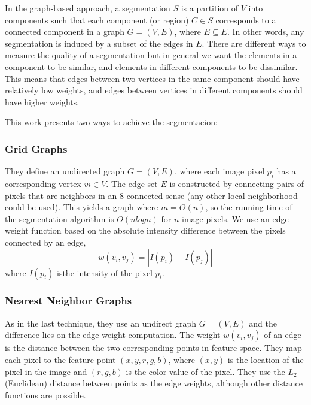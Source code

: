 In the graph-based approach, a segmentation $S$ is a partition of $V$ into components such that each component (or region) $C \in S$ corresponds to a connected component in a graph $G = (V, E)$, where $E \subseteq E$. In other words, any segmentation is induced by a subset of the edges in $E$. There are different ways to measure the quality of a segmentation but in general we want the elements in a component to be similar, and elements in different components to be dissimilar. This means that edges between two vertices in the same component should have relatively low weights, and edges between vertices in different components should have higher weights.

This work presents two ways to achieve the segmentacion:

\subsubsection{Grid Graphs}
They define an undirected graph $G = (V, E)$, where each image pixel $p_i$ has a corresponding vertex $vi \in V$. The edge set $E$ is constructed by connecting pairs of pixels that are neighbors in an 8-connected sense (any other local neighborhood could be used). This yields a graph where $m = O(n)$, so the running time of the segmentation algorithm is $O(n log n)$ for $n$ image pixels. We use an edge weight function based on the absolute intensity difference between the pixels connected by an edge, $$w(v_i, v_j) = |I(p_i) - I(p_j)|$$ where $I(p_i)$ isthe intensity of the pixel $p_i$.


\subsubsection{Nearest Neighbor Graphs}
As in the last technique, they use an undirect graph $G = (V, E)$ and the difference lies on the edge weight computation. The weight $w(v_i, v_j)$ of an edge is the distance between the two corresponding points in feature space. They map each pixel to the feature point $(x, y,r, g, b)$, where $(x, y)$ is the location of the pixel in the image and $(r, g, b)$ is the color value of the pixel. They use the $L_2$ (Euclidean) distance between points as the edge weights, although other distance functions are possible.


